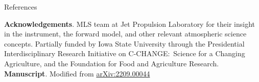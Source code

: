\documentclass[final]{beamer}
\newlength{\sepwidth}
\newlength{\colwidth}
\newcommand{\separatorcolumn}{\begin{column}{\sepwidth}\end{column}}
\begin{document}
\begin{frame}[t]
{\begin{minipage}[t][76cm][t]{58cm}
\begin{minipage}[t]{1.0\linewidth}
\begin{minipage}[t]{.5\linewidth}
          \begin{block}{References}
            \vspace{-1ex}
            \renewcommand*{\bibfont}{\small}
            \printbibliography[heading=none]{}
          \end{block}
        \end{minipage}
      \end{minipage}
    \end{minipage}%
  }
  \colorbox{black!0}{
    \begin{minipage}[t][76cm][t]{3cm}
    \end{minipage}%
  }

  \begin{minipage}[t][5cm][t]{116cm}
    \textbf{Acknowledgements}. MLS team at Jet Propulsion
    Laboratory for their insight in the instrument, the forward model, and other
    relevant atmospheric science concepts.
    Partially funded by Iowa State University through the
    Presidential Interdisciplinary Research Initiative on C-CHANGE:~Science
    for a Changing Agriculture, and the Foundation for Food and Agriculture
    Research.
    \textbf{Manuscript}. Modified from
    \href{https://doi.org/10.48550/arXiv.2209.00044}{arXiv:2209.00044}
  \end{minipage}

















\end{frame}
\end{document}
